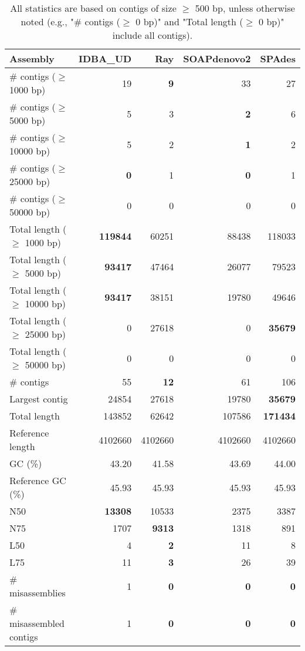 \documentclass[12pt,a4paper]{article}
\begin{document}
\begin{table}[ht]
\begin{center}
\caption{All statistics are based on contigs of size $\geq$ 500 bp, unless otherwise noted (e.g., "\# contigs ($\geq$ 0 bp)" and "Total length ($\geq$ 0 bp)" include all contigs).}
\begin{tabular}{|l*{4}{|r}|}
\hline
Assembly & IDBA\_UD & Ray & SOAPdenovo2 & SPAdes \\ \hline
\# contigs ($\geq$ 1000 bp) & 19 & {\bf 9} & 33 & 27 \\ \hline
\# contigs ($\geq$ 5000 bp) & 5 & 3 & {\bf 2} & 6 \\ \hline
\# contigs ($\geq$ 10000 bp) & 5 & 2 & {\bf 1} & 2 \\ \hline
\# contigs ($\geq$ 25000 bp) & {\bf 0} & 1 & {\bf 0} & 1 \\ \hline
\# contigs ($\geq$ 50000 bp) & 0 & 0 & 0 & 0 \\ \hline
Total length ($\geq$ 1000 bp) & {\bf 119844} & 60251 & 88438 & 118033 \\ \hline
Total length ($\geq$ 5000 bp) & {\bf 93417} & 47464 & 26077 & 79523 \\ \hline
Total length ($\geq$ 10000 bp) & {\bf 93417} & 38151 & 19780 & 49646 \\ \hline
Total length ($\geq$ 25000 bp) & 0 & 27618 & 0 & {\bf 35679} \\ \hline
Total length ($\geq$ 50000 bp) & 0 & 0 & 0 & 0 \\ \hline
\# contigs & 55 & {\bf 12} & 61 & 106 \\ \hline
Largest contig & 24854 & 27618 & 19780 & {\bf 35679} \\ \hline
Total length & 143852 & 62642 & 107586 & {\bf 171434} \\ \hline
Reference length & 4102660 & 4102660 & 4102660 & 4102660 \\ \hline
GC (\%) & 43.20 & 41.58 & 43.69 & 44.00 \\ \hline
Reference GC (\%) & 45.93 & 45.93 & 45.93 & 45.93 \\ \hline
N50 & {\bf 13308} & 10533 & 2375 & 3387 \\ \hline
N75 & 1707 & {\bf 9313} & 1318 & 891 \\ \hline
L50 & 4 & {\bf 2} & 11 & 8 \\ \hline
L75 & 11 & {\bf 3} & 26 & 39 \\ \hline
\# misassemblies & 1 & {\bf 0} & {\bf 0} & {\bf 0} \\ \hline
\# misassembled contigs & 1 & {\bf 0} & {\bf 0} & {\bf 0} \\ \hline

\end{tabular}
\end{center}
\end{table}
\end{document}
